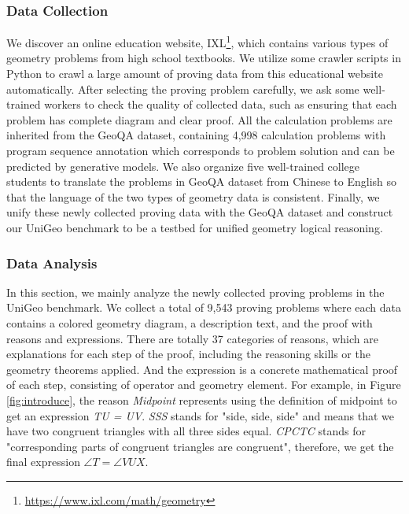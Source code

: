 \documentclass[11pt]{article}
\begin{document}
\subsubsection{Data Collection}

We discover an online education website, IXL\footnote{\href{https://www.ixl.com/math/geometry}{https://www.ixl.com/math/geometry}}, which contains various types of geometry problems from high school textbooks. 
We utilize some crawler scripts in Python to crawl a large amount of proving data from this educational website automatically.
After selecting the proving problem carefully, we ask some well-trained workers to check the quality of collected data, such as ensuring that each problem has complete diagram and clear proof.
All the calculation problems are inherited from the GeoQA dataset, containing 4,998 calculation problems with program sequence annotation which corresponds to problem solution and can be predicted by generative models. 
We also organize five well-trained college students to translate the problems in GeoQA dataset from Chinese to English so that the language of the two types of geometry data is consistent.
Finally, we unify these newly collected proving data with the GeoQA dataset and construct our UniGeo benchmark to be a testbed for unified geometry logical reasoning. 





\subsubsection{Data Analysis}
\label{data_analysis}



In this section, we mainly analyze the newly collected proving problems in the UniGeo benchmark.
We collect a total of 9,543 proving problems where each data contains a colored geometry diagram, a description text, and the proof with reasons and expressions.
There are totally 37 categories of reasons, which are explanations for each step of the proof, including the reasoning skills or the geometry theorems applied. And the expression is a concrete mathematical proof of each step, consisting of operator and geometry element.
For example, in Figure \ref{fig:introduce}, the reason \textit{Midpoint} represents using the definition of midpoint to get an expression \textit{TU = UV}. \textit{SSS} stands for "side, side, side" and means that we have two congruent triangles with all three sides equal. \textit{CPCTC} stands for "corresponding parts of congruent triangles are congruent", therefore, we get the final expression $\angle T = \angle VUX$.
\end{document}
